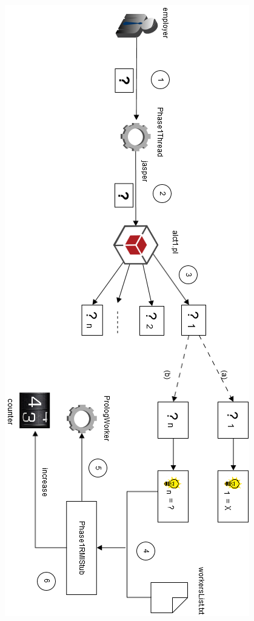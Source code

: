 \documentclass[a4paper, 11pt, oneside]{duthesis}
\begin{document}
\begin{enumerate}
\begin{figure}[H]
\centering
\includegraphics[scale=.7]{img/DIAG_7.png}
\caption{}
\label{DIAG_7}
\end{figure}

\newpage


\end{enumerate}
\end{document}
